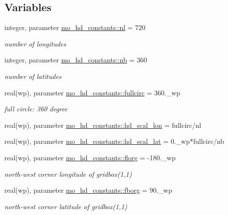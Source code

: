 \subsection*{Variables}
\begin{DoxyCompactItemize}
\item 
integer, parameter \hyperlink{namespacemo__hd__constants_a9be972e3a7c772eb94e17e1d538f418c}{mo\+\_\+hd\+\_\+constants\+::nl} = 720
\begin{DoxyCompactList}\small\item\em number of longitudes \end{DoxyCompactList}\item 
integer, parameter \hyperlink{namespacemo__hd__constants_a9973287d6e85ff29b6c46662b54e256d}{mo\+\_\+hd\+\_\+constants\+::nb} = 360
\begin{DoxyCompactList}\small\item\em number of latitudes \end{DoxyCompactList}\item 
real(wp), parameter \hyperlink{namespacemo__hd__constants_ad86ad4525b3aaf33c6b5a61de4a3dd77}{mo\+\_\+hd\+\_\+constants\+::fullcirc} = 360.\+\_\+wp
\begin{DoxyCompactList}\small\item\em full circle\+: 360 degree \end{DoxyCompactList}\item 
real(wp), parameter \hyperlink{namespacemo__hd__constants_a11321e92ff31b590a466fb310e67da2c}{mo\+\_\+hd\+\_\+constants\+::hd\+\_\+scal\+\_\+lon} = fullcirc/nl
\item 
real(wp), parameter \hyperlink{namespacemo__hd__constants_a6424c9dc04985720e8aa1960333184c7}{mo\+\_\+hd\+\_\+constants\+::hd\+\_\+scal\+\_\+lat} = 0.\+\_\+wp$\ast$fullcirc/nb
\item 
real(wp), parameter \hyperlink{namespacemo__hd__constants_a92e3ff05e4400fd3ce8a5b2b051040a3}{mo\+\_\+hd\+\_\+constants\+::florg} = -\/180.\+\_\+wp
\begin{DoxyCompactList}\small\item\em north-\/west corner longitude of gridbox(1,1) \end{DoxyCompactList}\item 
real(wp), parameter \hyperlink{namespacemo__hd__constants_a7270adbffa37eee2f760d2084fb208ee}{mo\+\_\+hd\+\_\+constants\+::fborg} = 90.\+\_\+wp
\begin{DoxyCompactList}\small\item\em north-\/west corner latitude of gridbox(1,1) \end{DoxyCompactList}\item 

\end{DoxyCompactItemize}
